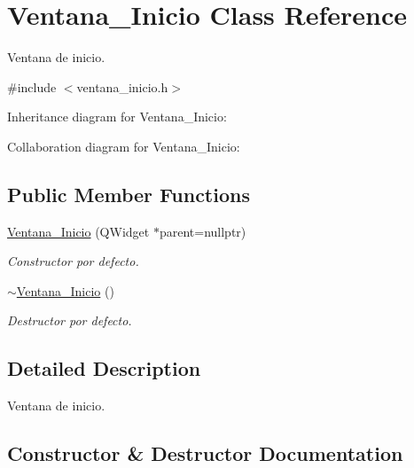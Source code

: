 \hypertarget{classVentana__Inicio}{}\section{Ventana\+\_\+\+Inicio Class Reference}
\label{classVentana__Inicio}


Ventana de inicio.  




{\ttfamily \#include $<$ventana\+\_\+inicio.\+h$>$}



Inheritance diagram for Ventana\+\_\+\+Inicio\+:


Collaboration diagram for Ventana\+\_\+\+Inicio\+:
\subsection*{Public Member Functions}
\begin{DoxyCompactItemize}
\item 
\hyperlink{classVentana__Inicio_a42d84603b48477d7c1d22cc73cd521b8}{Ventana\+\_\+\+Inicio} (Q\+Widget $\ast$parent=nullptr)
\begin{DoxyCompactList}\small\item\em Constructor por defecto. \end{DoxyCompactList}\item 
\mbox{\label{classVentana__Inicio_a112336e6022e9c66ebe167d21674f3ff}} 
\hyperlink{classVentana__Inicio_a112336e6022e9c66ebe167d21674f3ff}{$\sim$\+Ventana\+\_\+\+Inicio} ()
\begin{DoxyCompactList}\small\item\em Destructor por defecto. \end{DoxyCompactList}\end{DoxyCompactItemize}


\subsection{Detailed Description}
Ventana de inicio. 

\subsection{Constructor \& Destructor Documentation}
\mbox{\label{classVentana__Inicio_a42d84603b48477d7c1d22cc73cd521b8}} 
